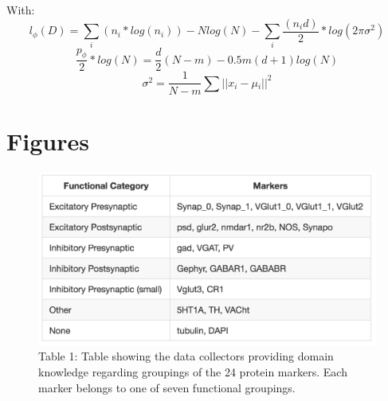 \documentclass{article}
\begin{document}
With:
\[l\widehat{}_{\phi}(D) = \sum_i (n_i * log(n_i)) - Nlog(N) - \sum_i\frac{(n_i d)}{2} * log(2\pi\sigma{}\widehat{}^2)
\]
\[
\frac{p_{\phi}}{2}*log(N) = \frac{d}{2}(N-m) - 0.5m(d+1)log(N)
\]
\[
\sigma{}\widehat{}^2 = \frac{1}{N-m} \sum{||x{}_i - \mu{}_i||}^2
\]

\section{Figures}
\begin{figure}[H]
	\includegraphics[width=\linewidth]{figures/table1.png}
	\caption{Table 1: Table showing the data collectors providing domain knowledge regarding groupings of the 24 protein markers. Each marker belongs to one of seven functional groupings.}
	\label{fig:table1}
\end{figure}
\end{document}
